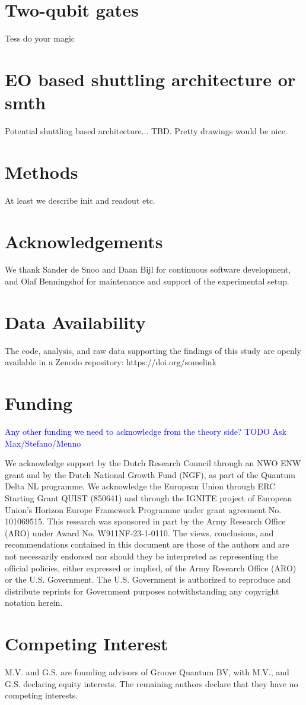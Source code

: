 \documentclass[aps,superscriptaddress,prx,nofootinbib,twocolumn,truncate=10]{revtex4-2}
\newcommand{\DC}[1]{\textcolor{blue}{#1}}
\begin{document}
\section{Two-qubit gates}
Tess do your magic

\section{EO based shuttling architecture or smth}

Potential shuttling based architecture... TBD. Pretty drawings would be nice.

\section*{Methods}

At least we describe init and readout etc.

\section*{Acknowledgements}
We thank Sander de Snoo and Daan Bijl for continuous software development, and Olaf Benningshof for maintenance and support of the experimental setup.
\section*{Data Availability}
The code, analysis, and raw data supporting the findings of this study are openly available in a Zenodo repository: https://doi.org/somelink
\section*{Funding}

\DC{Any other funding we need to acknowledge from the theory side? TODO Ask Max/Stefano/Menno}

We acknowledge support by the Dutch Research Council through an NWO ENW grant and by the Dutch National Growth Fund (NGF), as part of the Quantum Delta NL programme. We acknowledge the European Union through ERC Starting Grant QUIST (850641) and through the IGNITE project of European Union’s Horizon Europe Framework Programme under grant agreement No. 101069515. This research was sponsored in part by the Army Research Office (ARO) under Award No. W911NF-23-1-0110. The views, conclusions, and recommendations contained in this document are those of the authors and are not necessarily endorsed nor should they be interpreted as representing the official policies, either expressed or implied, of the Army Research Office (ARO) or the U.S. Government. The
U.S. Government is authorized to reproduce and distribute reprints for Government purposes notwithstanding any copyright notation herein.


\section*{Competing Interest}
M.V. and G.S. are founding advisors of Groove Quantum BV, with M.V., and G.S. declaring equity interests. The remaining authors declare that they have no competing interests.

% 
\end{document}

